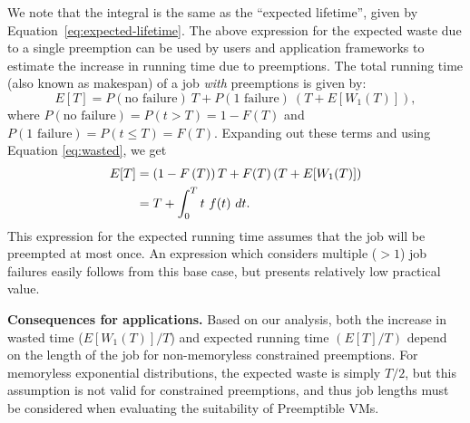 We note that the integral is the same as the ``expected lifetime'', given by Equation~\ref{eq:expected-lifetime}.
%
The above expression for the expected waste due to a single preemption can be used by users and application frameworks to estimate the increase in running time due to preemptions. %
The total running time (also known as makespan) of a job \emph{with} preemptions is given by:
\begin{equation}
  \label{eq:tot-run-time}
  E[T] = P(\text{no failure})~T + P(\text{1 failure})~\left(T + E[W_1(T)]\right),
\end{equation}
where $P(\text{no failure}) = P(t > T) =  1- F(T)$ and $P(\text{1 failure}) = P(t \leq T) = F(T)$.
Expanding out these terms and using Equation \ref{eq:wasted}, we get
%
\begin{align}
  \label{eq:tot-run-time-2}
  E[T] &= \left(1-F\left(T\right)\right)T + F(T)\left(T + E[W_1(T)]\right) \notag \\
  &= T + \int_0^{T} t~f(t)~dt.         
\end{align}
This expression for the expected running time assumes that the job will be preempted at most once.
An expression which considers multiple ($>1$) job failures easily follows from this base case, but presents relatively low practical value.



\noindent \textbf{Consequences for applications.}
Based on our analysis, both the increase in wasted time ($E[W_1(T)]/T$) and expected running time $(E[T]/T)$ depend on the length of the job for non-memoryless constrained preemptions. 
For memoryless exponential distributions, the expected waste is simply $T/2$, but this assumption is not valid for constrained preemptions, and thus job lengths must be considered when evaluating the suitability of Preemptible VMs. 


